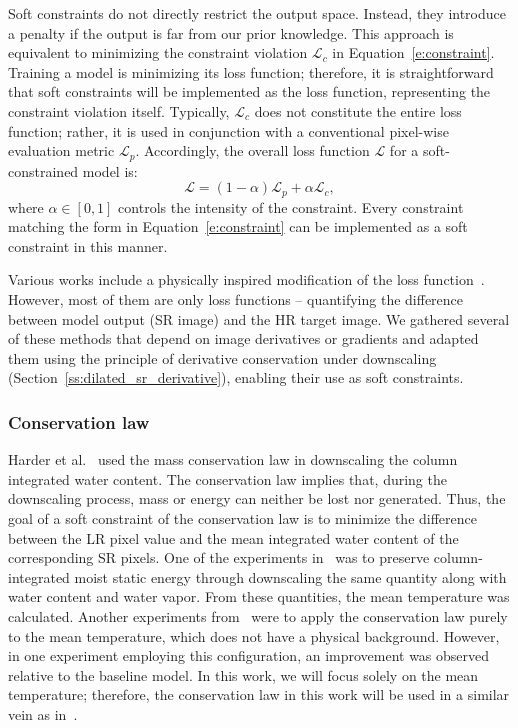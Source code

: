 Soft constraints do not directly restrict the output space.
Instead, they introduce a penalty if the output is far from our prior knowledge.
This approach is equivalent to minimizing the constraint violation $\mathcal{L}_c$ in Equation~\eqref{e:constraint}.
Training a model is minimizing its loss function; therefore, it is straightforward that soft constraints will be implemented as the loss function, representing the constraint violation itself.
Typically, $\mathcal{L}_c$ does not constitute the entire loss function; rather, it is used in conjunction with a conventional pixel-wise evaluation metric $\mathcal{L}_p$. 
Accordingly, the overall loss function $\mathcal{L}$ for a soft-constrained model is:
\begin{equation}
    \mathcal{L} = (1 - \alpha) \mathcal{L}_p + \alpha \mathcal{L}_c,
    \label{e:soft_constraint}
\end{equation}
where $\alpha \in [0, 1]$ controls the intensity of the constraint.
Every constraint matching the form in Equation~\eqref{e:constraint} can be implemented as a soft constraint in this manner.

Various works include a physically inspired modification of the loss function~\cite{Lu2019, Ge2023, Xiong2025}.
However, most of them are only loss functions -- quantifying the difference between model output (SR image) and the HR target image.
We gathered several of these methods that depend on image derivatives or gradients
and adapted them using the principle of derivative conservation under downscaling (Section~\ref{ss:dilated_sr_derivative}), enabling their use as soft constraints.

\subsubsection{Conservation law}
\label{sss:soft_conservation}

Harder et al.~\cite{Harder2023} used the mass conservation law in downscaling the column integrated water content. 
The conservation law implies that, during the downscaling process, mass or energy can neither be lost nor generated.
Thus, the goal of a soft constraint of the conservation law is to minimize the difference between the LR pixel value and the mean integrated water content of the corresponding SR pixels.
One of the experiments in~\cite{Harder2023} was to preserve column-integrated moist static energy through downscaling the same quantity along with water content and water vapor.
From these quantities, the mean temperature was calculated.
Another experiments from~\cite{Harder2023} were to apply the conservation law purely to the mean temperature, which does not have a physical background.
However, in one experiment employing this configuration, an improvement was observed relative to the baseline model.
In this work, we will focus solely on the mean temperature; therefore, the conservation law in this work will be used in a similar vein as in~\cite{Harder2023}.

